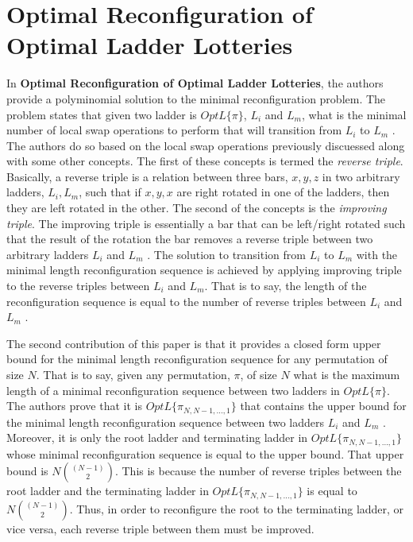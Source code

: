 \section{Optimal Reconfiguration of Optimal Ladder Lotteries}
In \textbf{Optimal Reconfiguration of Optimal Ladder Lotteries},
the authors provide a polyminomial solution to the 
minimal reconfiguration problem. The problem states that given 
two ladder is $OptL\{\pi\}$, $L_{i}$ and  $L_{m}$, what is the minimal number of 
local swap operations to perform that will transition from $L_{i}$ to $L_{m}$ \cite{A2}.
The authors do so based on the local swap operations previously 
discuessed along with some other concepts. The first of these concepts 
is termed the \emph{reverse triple}. Basically, a reverse triple is a relation
between three bars, $x,y,z$ in two arbitrary ladders, $L_{i}, L_{m}$, such that if $x,y,x$
are right rotated in one of the ladders, then they are left rotated in the other. 
The second of the concepts is the \emph{improving triple}. The improving triple is 
essentially a bar that can be left/right rotated such that the 
result of the rotation the bar removes a reverse triple between two arbitrary
ladders $L_{i}$ and $L_{m}$ \cite{A2}. The solution to transition from 
$L_{i}$ to $L_{m}$ with the minimal length reconfiguration sequence 
is achieved by applying improving triple to the reverse triples between 
$L_{i}$ and $L_{m}$. That is to say, the length of the reconfiguration sequence 
is equal to the number of reverse triples between $L_{i}$ and  $L_{m}$ \cite{A2}.\par
The second contribution of this paper is that it provides a closed form 
upper bound for the minimal length reconfiguration sequence for any permutation 
of size $N$. That is to say, given any permutation, $\pi$, of size $N$ what is the maximum 
length of a minimal reconfiguration sequence between two ladders in $OptL\{\pi\}$.
The authors prove that it is $OptL\{\pi_{N, N-1, \dots, 1}\}$ that contains the 
upper bound for the minimal length reconfiguration sequence between two ladders $L_{i}$ and 
$L_{m}$ \cite{A2}. Moreover, it is only the root ladder and terminating ladder in 
$OptL\{\pi_{N, N-1, \dots, 1}\}$ whose minimal reconfiguration sequence is equal to 
the upper bound. That upper bound is $N{(N-1) \choose 2}$. This is because 
the number of reverse triples between the root ladder and the terminating ladder 
in $OptL\{\pi_{N, N-1, \dots, 1}\}$ is equal to $N{(N-1) \choose 2}$. Thus, in 
order to reconfigure the root to the terminating ladder, or vice versa, each 
reverse triple between them must be improved.

